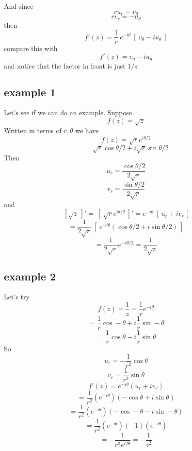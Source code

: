 \documentclass[11pt, oneside]{article}
\begin{document}
And since
\[ r u_r = v_{\theta} \]
\[ r v_r = -u_{\theta} \]
then
\[ f'(z) = \frac{1}{r} \ e^{-i \theta} \ [ \ v_{\theta} - i u_{\theta} \ ] \]
compare this with 
\[ f'(z) = v_y - iu_y \]
and notice that the factor in front is just $1/z$

\subsection*{example 1}

Let's see if we can do an example.  Suppose
\[ f(z) = \sqrt{z} \]
Written in terms of $r, \theta$ we have
\[ f(z) = \sqrt{r} e^{i \theta/2} \]
\[ = \sqrt{r} \cos \theta/2 + i \sqrt{r} \sin \theta/2 \]
Then
\[ u_r = \frac{\cos \theta/2}{2 \sqrt{r}} \]
\[ v_r = \frac{\sin \theta/2}{2 \sqrt{r}} \]
and
\[ \ [ \sqrt{z} \ ]' = \ [ \ \sqrt{r} e^{i \theta/2} \ ]' = e^{-i \theta} \ [ \ u_r + i v_r \ ] \]
\[ = \frac{1}{2 \sqrt{r}} \ [ \ e^{-i \theta} (\cos \theta/2 + i \sin \theta/2) \ ]    \]
\[ = \frac{1}{2 \sqrt{r}} e^{-i \theta/2} = \frac{1}{2 \sqrt{z}} \]

\subsection*{example 2}
Let's try
\[ f(z) = \frac{1}{z} = \frac{1}{r} e^{-i \theta} \]
\[ = \frac{1}{r} \cos - \theta + i \frac{1}{r} \sin - \theta \]
\[ = \frac{1}{r} \cos \theta - i \frac{1}{r} \sin \theta \]
So
\[ u_r = -\frac{1}{r^2} \cos \theta \]
\[ v_r = \frac{1}{r^2} \sin \theta \]
\[ f'(z) = e^{-i \theta}  (u_r + i v_r) \]
\[ = \frac{1}{r^2} ( e^{-i \theta}) (- \cos \theta + i \sin \theta) \]
\[ = \frac{1}{r^2} ( e^{-i \theta}) (- \cos - \theta - i \sin - \theta) \]
\[ = \frac{1}{r^2} ( e^{-i \theta}) (-1) (e^{-i \theta}) \]
\[ = -\frac{1}{r^2 e^{i 2\theta}} = -\frac{1}{z^2} \]
\end{document}
